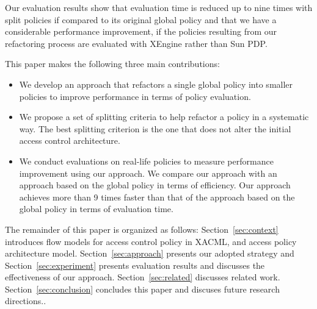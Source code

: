 Our evaluation results show that evaluation time is reduced up to nine times with split policies if compared to its original global policy 
and that we have a considerable performance improvement, if the policies resulting from our refactoring process are evaluated
with XEngine rather than Sun PDP.

This paper makes the following three main contributions:
\begin{itemize}
\item We develop an approach that refactors a single global policy into smaller policies to improve performance in terms of policy evaluation.
\item We propose a set of splitting criteria to help refactor a policy in a systematic way. The best splitting criterion is the one
that does not alter the initial access control architecture.
\item We conduct evaluations on real-life policies to measure performance improvement
using our approach. We compare our approach with an approach based on the global policy in terms of
efficiency. Our approach achieves more than 9 times faster than that of the approach based on the global policy in terms of evaluation time.
\end{itemize}


The remainder of this paper is organized as follows: Section~\ref{sec:context} introduces flow models for access control policy in XACML, and access policy architecture model.
Section~\ref{sec:approach} presents our adopted strategy and
Section~\ref{sec:experiment} presents evaluation results and discusses the effectiveness of our approach. Section~\ref{sec:related} discusses related work.
Section~\ref{sec:conclusion} concludes this paper and discuses future research directions..

